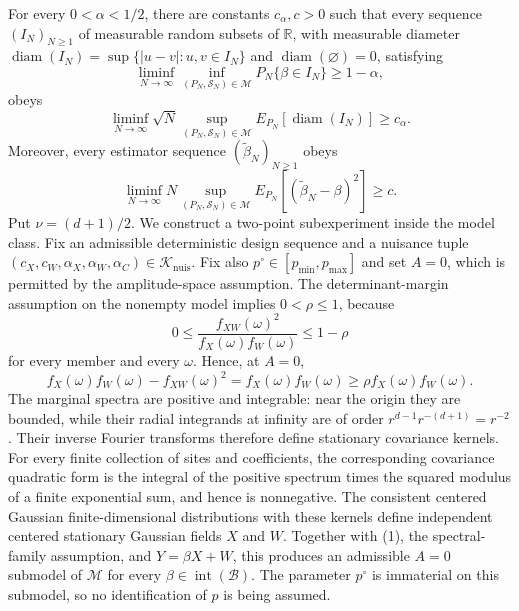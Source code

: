For every \(0<\alpha<1/2\), there are constants \(c_{\alpha},c>0\) such that every sequence \((I_N)_{N\geq 1}\) of measurable random subsets of \(\mathbb R\), with measurable diameter \(\operatorname{diam}(I_N)=\sup\{|u-v|:u,v\in I_N\}\) and \(\operatorname{diam}(\varnothing)=0\), satisfying
\[
 \liminf_{N\to\infty}\inf_{(P_N,\mathcal S_N)\in\mathcal M}
 P_N\{\beta\in I_N\}\geq 1-\alpha,
\]
obeys
\[
 \liminf_{N\to\infty}\sqrt N
 \sup_{(P_N,\mathcal S_N)\in\mathcal M}
 E_{P_N}[\operatorname{diam}(I_N)]\geq c_{\alpha}.
\]
Moreover, every estimator sequence \((\widetilde\beta_N)_{N\geq1}\) obeys
\[
 \liminf_{N\to\infty}N
 \sup_{(P_N,\mathcal S_N)\in\mathcal M}
 E_{P_N}[(\widetilde\beta_N-\beta)^2]\geq c.
\]
Put \(\nu=(d+1)/2\).  We construct a two-point subexperiment inside the model class.  Fix an admissible deterministic design sequence and a nuisance tuple \((c_X,c_W,\alpha_X,\alpha_W,\alpha_C)\in\mathcal K_{\mathrm{nuis}}\).  Fix also \(p^\circ\in[p_{\min},p_{\max}]\) and set \(A=0\), which is permitted by the amplitude-space assumption.  The determinant-margin assumption on the nonempty model implies \(0<\rho\leq1\), because
\[
 0\leq \frac{f_{XW}(\omega)^2}{f_X(\omega)f_W(\omega)}
 \leq 1-\rho
\]
for every member and every \(\omega\).  Hence, at \(A=0\),
\[
 f_X(\omega)f_W(\omega)-f_{XW}(\omega)^2
 =f_X(\omega)f_W(\omega)
 \geq\rho f_X(\omega)f_W(\omega).
 \tag{1}
\]
The marginal spectra are positive and integrable: near the origin they are bounded, while their radial integrands at infinity are of order \(r^{d-1}r^{-(d+1)}=r^{-2}\).  Their inverse Fourier transforms therefore define stationary covariance kernels.  For every finite collection of sites and coefficients, the corresponding covariance quadratic form is the integral of the positive spectrum times the squared modulus of a finite exponential sum, and hence is nonnegative.  The consistent centered Gaussian finite-dimensional distributions with these kernels define independent centered stationary Gaussian fields \(X\) and \(W\).  Together with (1), the spectral-family assumption, and \(Y=\beta X+W\), this produces an admissible \(A=0\) submodel of \(\mathcal M\) for every \(\beta\in\operatorname{int}(\mathcal B)\).  The parameter \(p^\circ\) is immaterial on this submodel, so no identification of \(p\) is being assumed.

